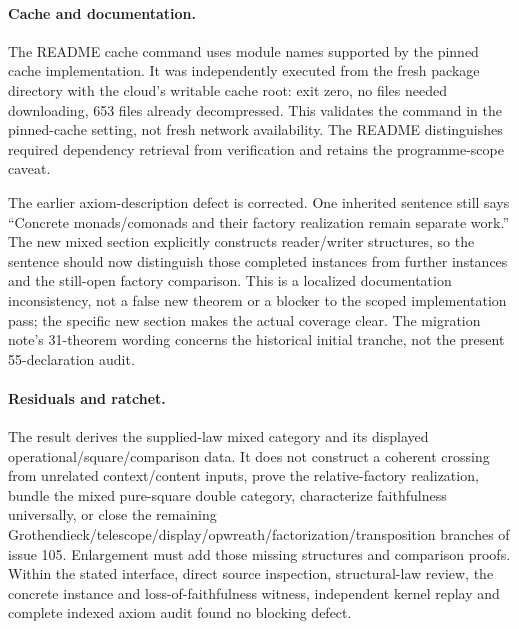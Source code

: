\documentclass{article}
\begin{document}
\paragraph{Cache and documentation.}
The README cache command uses module names supported by the pinned cache implementation. It was independently executed from the fresh package directory with the cloud's writable cache root: exit zero, no files needed downloading, 653 files already decompressed. This validates the command in the pinned-cache setting, not fresh network availability. The README distinguishes required dependency retrieval from verification and retains the programme-scope caveat.

The earlier axiom-description defect is corrected. One inherited sentence still says ``Concrete monads/comonads and their factory realization remain separate work.'' The new mixed section explicitly constructs reader/writer structures, so the sentence should now distinguish those completed instances from further instances and the still-open factory comparison. This is a localized documentation inconsistency, not a false new theorem or a blocker to the scoped implementation pass; the specific new section makes the actual coverage clear. The migration note's 31-theorem wording concerns the historical initial tranche, not the present 55-declaration audit.

\paragraph{Residuals and ratchet.}
The result derives the supplied-law mixed category and its displayed operational/square/comparison data. It does not construct a coherent crossing from unrelated context/content inputs, prove the relative-factory realization, bundle the mixed pure-square double category, characterize faithfulness universally, or close the remaining Grothendieck/telescope/display/opwreath/factorization/transposition branches of issue 105. Enlargement must add those missing structures and comparison proofs. Within the stated interface, direct source inspection, structural-law review, the concrete instance and loss-of-faithfulness witness, independent kernel replay and complete indexed axiom audit found no blocking defect.
\end{document}
